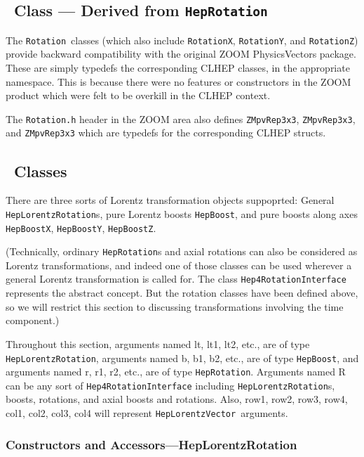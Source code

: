 \documentclass[twoside,12pt]{article}
\def \Ro {{\tt HepRotation}}
\def \Ros {{\tt Rotation}}
\def \LV {{\tt HepLorentzVector}}
\def \LT {{\tt HepLorentzRotation}}
\def \LB {{\tt HepBoost}}
\begin{document}
\subsection{\protect\Ros\ Class --- Derived from \Ro }

The \Ros\ classes (which also include {\tt RotationX},
{\tt RotationY}, and {\tt RotationZ}) provide backward compatibility 
with the original ZOOM PhysicsVectors package.  
These are simply typedefs the corresponding CLHEP classes, 
in the appropriate namespace.
This is because there were no features or constructors in the ZOOM 
product which were felt to be overkill in the CLHEP context.  

The {\tt Rotation.h} header in the ZOOM area also defines
{\tt ZMpvRep3x3}, {\tt ZMpvRep3x3}, and {\tt ZMpvRep3x3} which 
are typedefs for the corresponding CLHEP structs.

\subsection{\protect\LT\ Classes}
\label{ltmethods}

There are three sorts of Lorentz transformation objects suppoprted:  
General \LT s, pure Lorentz boosts {\tt HepBoost}, and pure boosts 
along axes {\tt HepBoostX}, {\tt HepBoostY}, {\tt HepBoostZ}.   

(Technically, ordinary \Ro s and axial rotations can also be considered
as Lorentz transformations, and indeed one of those classes can be used
wherever a general Lorentz transformation is called for.  The class
{\tt Hep4RotationInterface} represents the abstract concept.
But the rotation classes have been defined above, so we will restrict this 
section to discussing transformations involving the time component.)

Throughout this section, 
arguments named lt, lt1, lt2, etc., are of type \LT,
arguments named b, b1, b2, etc., are of type \LB, and
arguments named r, r1, r2, etc., are of type \Ro .
Arguments named R can be any sort of {\tt Hep4RotationInterface} including
\LT s, boosts, rotations, and axial boosts and rotations.
Also, row1, row2, row3, row4, col1, col2, col3, col4
will represent \LV\ arguments.

\subsubsection{Constructors and Accessors---HepLorentzRotation}
\end{document}
